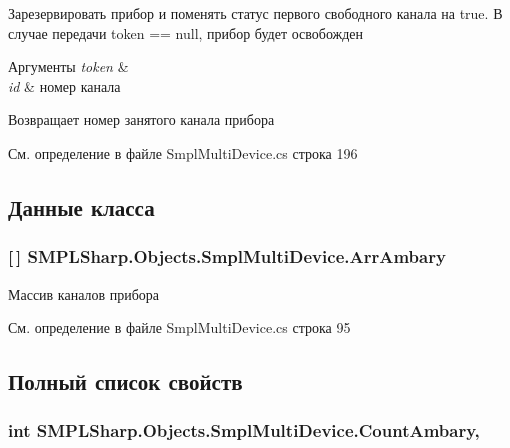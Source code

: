 Зарезервировать прибор и поменять статус первого свободного канала на true. В случае передачи token == null, прибор будет освобожден 


\begin{DoxyParams}{Аргументы}
{\em token} & \\
\hline
{\em id} & номер канала\\
\hline
\end{DoxyParams}
\begin{DoxyReturn}{Возвращает}
номер занятого канала прибора
\end{DoxyReturn}


См. определение в файле Smpl\-Multi\-Device.\-cs строка 196



\subsection{Данные класса}
\hypertarget{class_s_m_p_l_sharp_1_1_objects_1_1_smpl_multi_device_a79eb6ab1f7b988772404220d27fa78b0}{
\subsubsection[{Arr\-Ambary}]{ \mbox{[}$\,$\mbox{]} S\-M\-P\-L\-Sharp.\-Objects.\-Smpl\-Multi\-Device.\-Arr\-Ambary}}\label{d8/d23/class_s_m_p_l_sharp_1_1_objects_1_1_smpl_multi_device_a79eb6ab1f7b988772404220d27fa78b0}


Массив каналов прибора 



См. определение в файле Smpl\-Multi\-Device.\-cs строка 95



\subsection{Полный список свойств}
\hypertarget{class_s_m_p_l_sharp_1_1_objects_1_1_smpl_multi_device_aefb2897375082ae37730737eedf4c1ec}{
\subsubsection[{Count\-Ambary}]{\setlength{\rightskip}{0pt plus 5cm}int S\-M\-P\-L\-Sharp.\-Objects.\-Smpl\-Multi\-Device.\-Count\-Ambary\hspace{0.3cm}{\ttfamily [get]}, {\ttfamily [set]}}}\label{d8/d23/class_s_m_p_l_sharp_1_1_objects_1_1_smpl_multi_device_aefb2897375082ae37730737eedf4c1ec}


